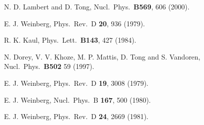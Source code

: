 \documentclass[a4paper,preprint,preprintnumbers,amsmath,amssymb]{revtex4}
\begin{document}
\begin{thebibliography}{99}
N. D. Lambert and D. Tong, Nucl.\ Phys.\ {\bf B569}, 606 (2000).

E. J. Weinberg, Phys.\ Rev.\ D {\bf 20}, 936 (1979).

R. K. Kaul, Phys.\ Lett.\ {\bf B143}, 427 (1984).
 
N. Dorey, V. V. Khoze, M. P. Mattis, D. Tong and S. Vandoren,
Nucl.\ Phys.\ {\bf B502} 59 (1997).

E. J. Weinberg, Phys.\ Rev.\ D {\bf 19}, 3008 (1979).

E. J. Weinberg, Nucl.\ Phys.\ B {\bf 167}, 500 (1980).

E. J. Weinberg, Phys.\ Rev.\ D {\bf 24}, 2669 (1981).

\end{thebibliography}
\end{document}
